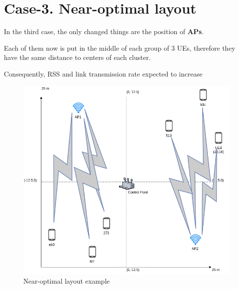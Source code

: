 \hypertarget{case-3.-near-optimal-layout}{%
\section{Case-3. Near-optimal
layout}\label{case-3.-near-optimal-layout}}

In the third case, the only changed things are the position of
\textbf{APs}.

Each of them now is put in the middle of each group of 3 UEs, therefore
they have the same distance to centers of each cluster.

Consequently, RSS and link transmission rate expected to increase

\begin{figure}[H]
	\centering
	\includegraphics[width=\linewidth,keepaspectratio]{images/05-cases-description-Exp4-Near-Optimal.png}
\caption{Near-optimal layout example}
\end{figure}
